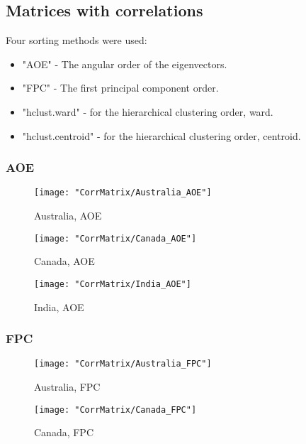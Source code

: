 \documentclass[a4paper]{article}
\begin{document}
\subsection{Matrices with correlations}
Four sorting methods were used:
\begin{itemize}
\item "AOE" -  The angular order of the eigenvectors.
\item "FPC" - The first principal component order.
\item "hclust.ward" - for the hierarchical clustering order, ward.
\item "hclust.centroid" - for the hierarchical clustering order, centroid.
\end{itemize}

\subsubsection{AOE}

\begin{figure}[H]
\begin{center}
\texttt{[image: "CorrMatrix/Australia\_AOE"]}
\caption{Australia,  AOE}
\label{fig:2}
\end{center}
\end{figure}

\begin{figure}[H]
\begin{center}
\texttt{[image: "CorrMatrix/Canada\_AOE"]}
\caption{Canada,  AOE}
\label{fig:2}
\end{center}
\end{figure}

\begin{figure}[H]
\begin{center}
\texttt{[image: "CorrMatrix/India\_AOE"]}
\caption{India,  AOE}
\label{fig:2}
\end{center}
\end{figure}

\subsubsection{FPC}

\begin{figure}[H]
\begin{center}
\texttt{[image: "CorrMatrix/Australia\_FPC"]}
\caption{Australia,  FPC}
\label{fig:2}
\end{center}
\end{figure}

\begin{figure}[H]
\begin{center}
\texttt{[image: "CorrMatrix/Canada\_FPC"]}
\caption{Canada,  FPC}
\label{fig:2}
\end{center}
\end{figure}
\end{document}
